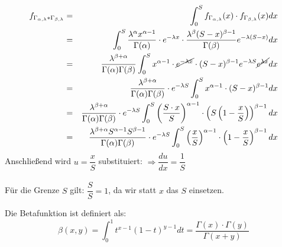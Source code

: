 \begin{uebsp}
\begin{Answer}
\begin{eqnarray*}
f_{\Gamma_{\alpha,\lambda}*\Gamma_{\beta,\lambda}} &=& \int_0^S f_{\Gamma_{\alpha, \lambda}}(x) \cdot f_{\Gamma_{\beta, \lambda}}(x)dx \\
 &=& \int_0^S\frac{\lambda^\alpha x^{\alpha-1}}{\Gamma(\alpha)}\cdot e^{-\lambda x}\cdot \frac{\lambda^{\beta}(S-x)^{\beta-1}}{\Gamma(\beta)}e^{-\lambda(S-x)}dx \\
 &=& \frac{\lambda^{\beta+\alpha}}{\Gamma(\alpha)\Gamma(\beta)} \int_0^S x^{\alpha-1}\cdot \cancel{e^{-\lambda x}}\cdot (S-x)^{\beta-1} e^{-\lambda S} \cancel{e^{\lambda x}}dx\\
 &=& \frac{\lambda^{\beta+\alpha}}{\Gamma(\alpha)\Gamma(\beta)}\cdot e^{-\lambda S} \int_0^S x^{\alpha-1}\cdot (S-x)^{\beta-1} dx\\
 &=& \frac{\lambda^{\beta+\alpha}}{\Gamma(\alpha)\Gamma(\beta)}\cdot e^{-\lambda S} \int_0^S \left(\frac{S\cdot x}{S}\right)^{\alpha-1}\cdot \left(S\left(1-\frac{x}{S}\right)\right)^{\beta-1} dx\\
 &=& \frac{\lambda^{\beta+\alpha}S^{\alpha-1}S^{\beta-1}}{\Gamma(\alpha)\Gamma(\beta)}\cdot e^{-\lambda S} \int_0^S \left(\frac{x}{S}\right)^{\alpha-1}\cdot \left(1-\frac{x}{S}\right)^{\beta-1} dx\\
\end{eqnarray*}
Anschließend wird $u=\dfrac{x}{S}$ substituiert: $\Rightarrow\dfrac{du}{dx}=\dfrac{1}{S}$\\\\
Für die Grenze $S$ gilt: $\dfrac{S}{S}=1$, da wir statt $x$ das $S$ einsetzen.

\begin{uebsp_theory}
Die Betafunktion ist definiert als:
\[\beta(x,y)=\int_0^1t^{x-1}(1-t)^{y-1}dt=\frac{\Gamma(x)\cdot\Gamma(y)}{\Gamma(x+y)}\]
\end{uebsp_theory}


\end{Answer}
\end{uebsp}
